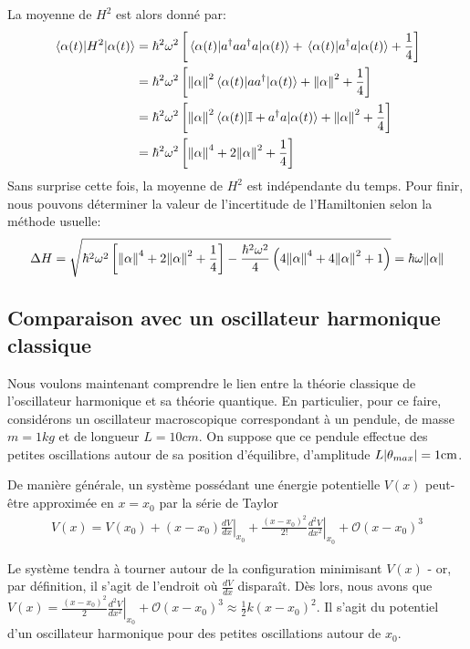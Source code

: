 \documentclass[11pt,oneside,a4paper]{article}
\newcommand{\h}{\ensuremath{\hbar}}
\begin{document}
La moyenne de $H^2$ est alors donné par:
\begin{align}
  \expval{H^2}{\alpha(t)} &= \h^2\omega^2\left[\expval{a^\dagger a a^\dagger a}{\alpha(t)}+\expval{a^\dagger a}{\alpha(t)}+\frac{1}{4}\right]\\
  &= \h^2\omega^2\left[\norm{\alpha}^2\expval{aa^\dagger}{\alpha(t)}+\norm{\alpha}^2+\frac{1}{4}\right]\\
  &= \h^2\omega^2\left[\norm{\alpha}^2\expval{\mathbb{I}+a^\dagger a}{\alpha(t)}+\norm{\alpha}^2+\frac{1}{4}\right]\\
  &= \h^2\omega^2\left[\norm{\alpha}^4+2\norm{\alpha}^2+\frac{1}{4}\right]
\end{align}
Sans surprise cette fois, la moyenne de $H^2$ est indépendante du temps. Pour finir, nous pouvons déterminer la valeur de l'incertitude de l'Hamiltonien selon la méthode usuelle:
\begin{align}
  \Delta H = \sqrt{\h^2\omega^2\left[\norm{\alpha}^4+2\norm{\alpha}^2+\frac{1}{4}\right]-\frac{\h^2\omega^2}{4}\left(4\norm{\alpha}^4+4\norm{\alpha}^2+1\right)} = \h\omega\norm{\alpha}
\end{align}

\subsection{Comparaison avec un oscillateur harmonique classique}

Nous voulons maintenant comprendre le lien entre la théorie classique de l'oscillateur harmonique et sa théorie quantique. En particulier, pour ce faire, considérons un oscillateur macroscopique correspondant à un pendule, de masse $m=1\si{kg}$ et de longueur $L = 10\si{cm}$. On suppose que ce pendule effectue des petites oscillations autour de sa position d'équilibre, d'amplitude $L\absolutevalue{\theta_{max}}=1\si{cm}$.

De manière générale, un système possédant une énergie potentielle $V(x)$ peut-être approximée en $x=x_0$ par la série de Taylor
\begin{align}
  V(x) = V(x_0) + \left(x-x_0\right)\left.\frac{dV}{dx}\right|_{x_0} + \frac{\left(x-x_0\right)^2}{2!} \left.\frac{d^2V}{dx^2}\right|_{x_0} + \mathcal O(x-x_0)^3
\end{align} 

Le système tendra à tourner autour de la configuration minimisant $V(x)$ - or, par définition, il s'agit de l'endroit où $\frac{dV}{dx}$ disparaît. Dès lors, nous avons que $V(x) = \frac{\left(x-x_0\right)^2}{2} \left.\frac{d^2V}{dx^2}\right|_{x_0} + \mathcal O(x-x_0)^3 \approx \frac{1}{2}k\left(x-x_0\right)^2$. Il s'agit du potentiel d'un oscillateur harmonique pour des petites oscillations autour de $x_0$.
\end{document}
